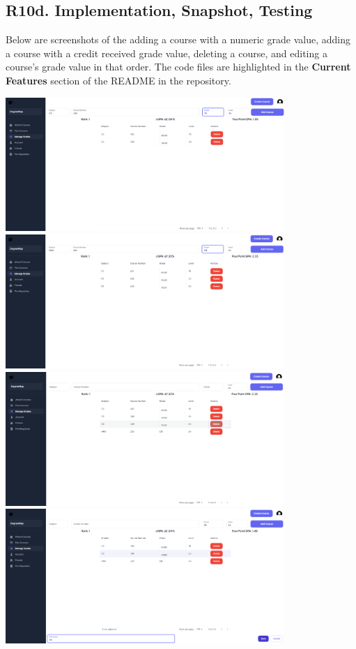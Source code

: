 \documentclass[12pt, a4paper]{article}
\begin{document}
\subsection*{R10d. Implementation, Snapshot, Testing}
Below are screenshots of the adding a course with a numeric grade value, adding a course with a credit received grade value, deleting a course, and editing a course's grade value in that order. The code files are highlighted in the \textbf{Current Features} section of the README in the repository.
\begin{center}
    \includegraphics[width=400px]{R10/i1}
    \includegraphics[width=400px]{R10/i2}
    \includegraphics[width=400px]{R10/i3}
    \includegraphics[width=400px]{R10/i4}

\end{center}
\end{document}
